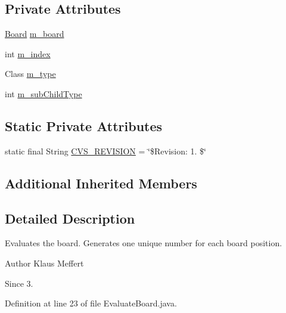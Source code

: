 \subsection*{Private Attributes}
\begin{DoxyCompactItemize}
\item 
\hyperlink{classexamples_1_1gp_1_1tictactoe_1_1_board}{Board} \hyperlink{classexamples_1_1gp_1_1tictactoe_1_1_evaluate_board_a310419ed2fa9f1234affdf3caf018223}{m\-\_\-board}
\item 
int \hyperlink{classexamples_1_1gp_1_1tictactoe_1_1_evaluate_board_aeca29a755ed186329ba08b030f43eda1}{m\-\_\-index}
\item 
Class \hyperlink{classexamples_1_1gp_1_1tictactoe_1_1_evaluate_board_ae9ffb194a6279b8a61499b73e99ae01e}{m\-\_\-type}
\item 
int \hyperlink{classexamples_1_1gp_1_1tictactoe_1_1_evaluate_board_a48960165a492727c790197ffff4c4ead}{m\-\_\-sub\-Child\-Type}
\end{DoxyCompactItemize}
\subsection*{Static Private Attributes}
\begin{DoxyCompactItemize}
\item 
static final String \hyperlink{classexamples_1_1gp_1_1tictactoe_1_1_evaluate_board_a11153991bc1f120315629c7a1b2e4614}{C\-V\-S\-\_\-\-R\-E\-V\-I\-S\-I\-O\-N} = \char`\"{}\$Revision\-: 1. \$\char`\"{}
\end{DoxyCompactItemize}
\subsection*{Additional Inherited Members}


\subsection{Detailed Description}
Evaluates the board. Generates one unique number for each board position.

\begin{DoxyAuthor}{Author}
Klaus Meffert 
\end{DoxyAuthor}
\begin{DoxySince}{Since}
3. 
\end{DoxySince}


Definition at line 23 of file Evaluate\-Board.\-java.



